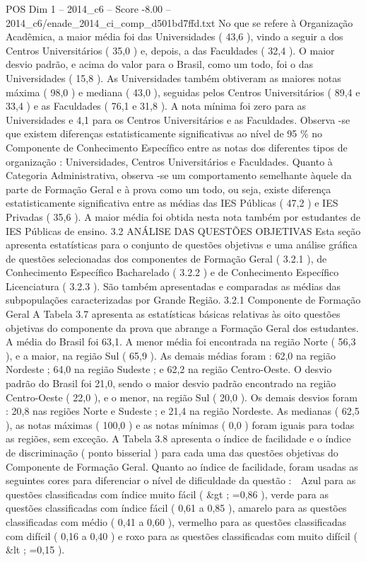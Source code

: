 \begin{textsample}{POS Dim 1 – 2014\_c6 – Score -8.00 – 2014\_c6/enade\_2014\_ci\_comp\_d501bd7ffd.txt}
No que se refere à Organização Acadêmica, a maior média foi das Universidades ( 43,6 ), vindo a seguir a dos Centros Universitários ( 35,0 ) e, depois, a das Faculdades ( 32,4 ).
O maior desvio padrão, e acima do valor para o Brasil, como um todo, foi o das Universidades ( 15,8 ).
As Universidades também obtiveram as maiores notas máxima ( 98,0 ) e mediana ( 43,0 ), seguidas pelos Centros Universitários ( 89,4 e 33,4 ) e as Faculdades ( 76,1 e 31,8 ).
A nota mínima foi zero para as Universidades e 4,1 para os Centros Universitários e as Faculdades.
Observa -se que existem diferenças estatisticamente significativas ao nível de 95 \% no Componente de Conhecimento Específico entre as notas dos diferentes tipos de organização : Universidades, Centros Universitários e Faculdades.
Quanto à Categoria Administrativa, observa -se um comportamento semelhante àquele da parte de Formação Geral e à prova como um todo, ou seja, existe diferença estatisticamente significativa entre as médias das IES Públicas ( 47,2 ) e IES Privadas ( 35,6 ).
A maior média foi obtida nesta nota também por estudantes de IES Públicas de ensino. 3.2 ANÁLISE DAS QUESTÕES OBJETIVAS Esta seção apresenta estatísticas para o conjunto de questões objetivas e uma análise gráfica de questões selecionadas dos componentes de Formação Geral ( 3.2.1 ), de Conhecimento Específico Bacharelado ( 3.2.2 ) e de Conhecimento Específico Licenciatura ( 3.2.3 ).
São também apresentadas e comparadas as médias das subpopulações caracterizadas por Grande Região. 3.2.1 Componente de Formação Geral A Tabela 3.7 apresenta as estatísticas básicas relativas às oito questões objetivas do componente da prova que abrange a Formação Geral dos estudantes.
A média do Brasil foi 63,1.
A menor média foi encontrada na região Norte ( 56,3 ), e a maior, na região Sul ( 65,9 ).
As demais médias foram : 62,0 na região Nordeste ; 64,0 na região Sudeste ; e 62,2 na região Centro-Oeste.
O desvio padrão do Brasil foi 21,0, sendo o maior desvio padrão encontrado na região Centro-Oeste ( 22,0 ), e o menor, na região Sul ( 20,0 ).
Os demais desvios foram : 20,8 nas regiões Norte e Sudeste ; e 21,4 na região Nordeste.
As medianas ( 62,5 ), as notas máximas ( 100,0 ) e as notas mínimas ( 0,0 ) foram iguais para todas as regiões, sem exceção.
A Tabela 3.8 apresenta o índice de facilidade e o índice de discriminação ( ponto bisserial ) para cada uma das questões objetivas do Componente de Formação Geral.
Quanto ao índice de facilidade, foram usadas as seguintes cores para diferenciar o nível de dificuldade da questão :  Azul para as questões classificadas com índice muito fácil ( \&gt ; =0,86 ), verde para as questões classificadas com índice fácil ( 0,61 a 0,85 ), amarelo para as questões classificadas com médio ( 0,41 a 0,60 ), vermelho para as questões classificadas com difícil ( 0,16 a 0,40 ) e roxo para as questões classificadas com muito difícil ( \&lt ; =0,15 ).

\end{textsample}
